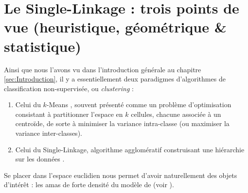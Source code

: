 
\chapter{Le Single-Linkage : trois points de vue (heuristique, géométrique \& statistique)}
\label{chap:single-linkage_trois_vues}


Ainsi que nous l'avons vu dans l'introduction générale au chapitre \ref{sec:Introduction}, il y a essentiellement deux paradigmes d'algorithmes de classification non-supervisée, ou \emph{clustering} :
\begin{enumerate}
  \item Celui du $k$-{Means} \cite{Lloyd1982}, souvent présenté comme un problème d'optimisation consistant à partitionner l'espace en $k$ cellules, chacune associée à un centroïde, de sorte à minimiser la variance intra-classe (ou maximiser la variance inter-classes).
  \item Celui du {Single-Linkage}, algorithme agglomératif construisant une hiérarchie sur les données \cite{DendriteSingleLinkage1951, GowerRoss1969}.
\end{enumerate}

Se placer dans l'espace euclidien nous permet d'avoir naturellement des objets d'intérêt : les amas de forte densité du modèle de  \cite{hartigan81} (voir ). 

